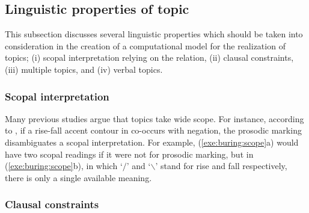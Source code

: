 \subsection{Linguistic properties of topic}
\label{3:ssec:properties-topic}



This subsection discusses several linguistic properties which should
be taken into consideration in the creation of a computational model
for the realization of topics; (i) scopal interpretation relying on
the  relation, (ii) clausal constraints, (iii) multiple
topics, and (iv) verbal topics.



\subsubsection{Scopal interpretation}
\label{3:sssec:scopal-interpretation}

Many previous studies argue that topics take wide scope. For instance,
according to \citet{buring:97}, if a rise-fall accent contour in
 co-occurs with negation, the prosodic
marking disambiguates a scopal interpretation. For example,
(\ref{exe:buring:scope}a) would have two scopal readings if it were
not for prosodic marking, but in (\ref{exe:buring:scope}b), in which
`\ensuremath{\slash}' and `\ensuremath{\backslash}' stand for rise and
fall respectively, there is only a single available meaning.








\subsubsection{Clausal constraints}
\label{3:sssec:clausal-constraints}



